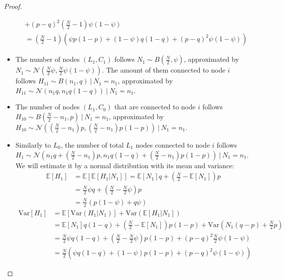 \begin{proof}
\begin{itemize}
\begin{align*}
 &+  (p-q)^2\left(\frac{N}{2}-1\right)\psi(1-\psi) \\ 
 &= \left(\frac{N}{2}-1\right) (\psi p (1-p) + (1-\psi) q (1-q) + (p-q)^2\psi(1-\psi)) 
 \end{align*}
	\item The number of nodes $(L_1,C_1)$ follows $N_{1} \sim B(\frac{N}{2},\psi)$, approximated by $N_{1}\sim \mathcal {N}(\frac{N}{2}\psi, \frac{N}{2}\psi(1-\psi))$.
 The amount of them connected to node $i$ follows $H_{11} \sim B(n_{1},q)\ |\ N_{1} = n_{1}$,
 approximated by $H_{11} \sim  \mathcal {N}(n_{1}q, n_{1}q(1-q))\ |\ N_{1} = n_{1}$. 
	\item The number of nodes $(L_1,C_0)$ that are connected to node $i$ follows $H_{10} \sim B(\frac{N}{2} - n_{1},p)\ |\ N_{1} = n_{1}$, approximated by $H_{10} \sim \mathcal {N}((\frac{N}{2} - n_{1})p, (\frac{N}{2} - n_{1})p(1-p))\ |\ N_{1} = n_{1}$. 
 \item Similarly to $L_0$, the number of total $L_1$ nodes connected to node $i$ follows $H_1 \sim \mathcal {N}(n_{1}q + (\frac{N}{2} - n_{1})p, n_{1}q(1-q) + (\frac{N}{2} - n_{1})p(1-p))\ |\ N_{1} = n_{1}$. We will estimate it by a normal distribution with its mean and variance:
 \begin{align*}
 \mathbb{E}[H_1] &= \mathbb{E}[\mathbb{E}[H_1|N_1]] = \mathbb{E}[N_1]q + (\frac{N}{2} - \mathbb{E}[N_1])p \\
 &= \frac{N}{2}\psi q + \left(\frac{N}{2} - \frac{N}{2}\psi\right)p \\
 &= \frac{N}{2} (p (1-\psi) + q \psi) 
 \end{align*}
 \begin{align*}
 \text{Var}[H_1] &= \mathbb{E}[\text{Var}(H_1|N_1)]+\text{Var}(\mathbb{E}[H_1|N_1]) \\
 &= \mathbb{E}[N_1]q(1-q) + \left(\frac{N}{2} - \mathbb{E}[N_1]\right)p(1-p) +  \text{Var}\left(N_1 (q-p) + \frac{N}{2}p\right) \\ 
 &= \frac{N}{2}\psi q(1-q) + \left(\frac{N}{2} - \frac{N}{2}\psi\right)p(1-p) +  (p-q)^2\frac{N}{2}\psi(1-\psi) \\ 
 &= \frac{N}{2}(\psi q(1-q) + (1 - \psi)p(1-p)  +  (p-q)^2\psi(1-\psi)) 
 \end{align*}
 
\end{itemize}


\end{proof}
